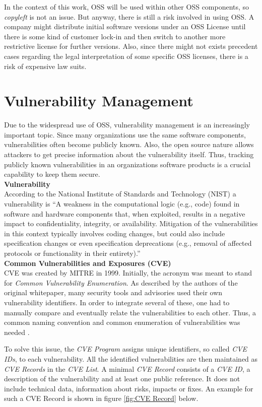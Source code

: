 In the context of this work, OSS will be used within other OSS components, so \textit{copyleft} is not an issue. But anyway, there is still a risk involved in using OSS. A company might distribute initial software versions under an OSS License until there is some kind of customer lock-in and then switch to another more restrictive license for further versions. Also, since there might not exists precedent cases regarding the legal interpretation of some specific OSS licenses, there is a risk of expensive law suits.

\section{Vulnerability Management}
Due to the widespread use of OSS, vulnerability management is an increasingly important topic. Since many organizations use the same software components, vulnerabilities often become publicly known. Also, the open source nature allows attackers to get precise information about the vulnerability itself. Thus, tracking publicly known vulnerabilities in an organizations software products is a crucial capability to keep them secure.\\

\noindent
\textbf{Vulnerability}\\
\noindent
According to the National Institute of Standards and Technology (NIST) a vulnerability is \enquote{A weakness in the computational logic (e.g., code) found in software and hardware components that, when exploited, results in a negative impact to confidentiality, integrity, or availability. Mitigation of the vulnerabilities in this context typically involves coding changes, but could also include specification changes or even specification deprecations (e.g., removal of affected protocols or functionality in their entirety).}\cite{NVDWebsite}\\

\noindent
\textbf{Common Vulnerabilities and Exposures (CVE)}\\
\noindent 
CVE was created by MITRE in 1999. Initially, the acronym was meant to stand for \textit{Common Vulnerability Enumeration}. As described by the authors of the original whitepaper, many security tools and advisories used their own vulnerability identifiers. In order to integrate several of these, one had to manually compare and eventually relate the vulnerabilities to each other. Thus, a common naming convention and common enumeration of vulnerabilities was needed \cite{CVEOriginal}.\par
To solve this issue, the \textit{CVE Program} assigns unique identifiers, so called \textit{CVE IDs}, to each vulnerability. All the identified vulnerabilities are then maintained as \textit{CVE Records} in the \textit{CVE List}. A minimal \textit{CVE Record} consists of a \textit{CVE ID}, a description of the vulnerability and at least one public reference. It does not include technical data, information about risks, impacts or fixes. An example for such a CVE Record is shown in figure \ref{fig:CVE Record} below.

